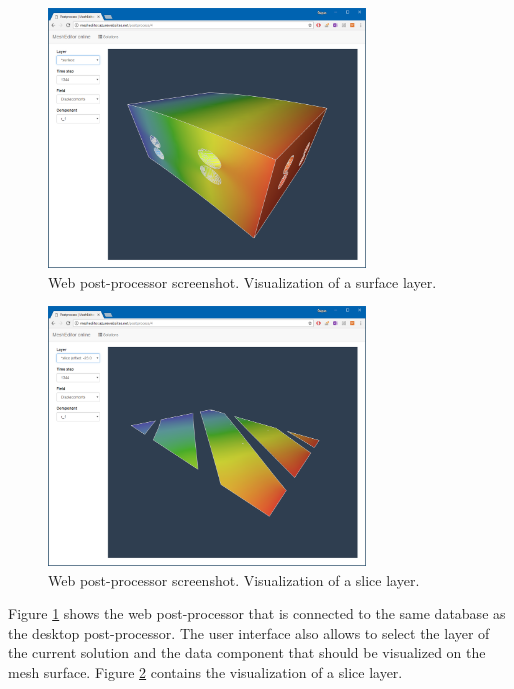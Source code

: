 \begin{figure}[H]
    \centering
    \includegraphics[width=0.75\textwidth]{figures/chapter-data-management/web-postprocessor-surface}
    \decoRule
    \caption{Web post-processor screenshot. Visualization of a surface layer.}
    \label{fig:web-postprocessor-surface}
\end{figure}

\begin{figure}[H]
    \centering
    \includegraphics[width=0.75\textwidth]{figures/chapter-data-management/web-postprocessor-slice}
    \decoRule
    \caption{Web post-processor screenshot. Visualization of a slice layer.}
    \label{fig:web-postprocessor-slice}
\end{figure}

Figure \ref{fig:web-postprocessor-surface} shows the web post-processor that is connected to the same database as the desktop post-processor. The user interface also allows to select the layer of the current solution and the data component that should be visualized on the mesh surface. Figure \ref{fig:web-postprocessor-slice} contains the visualization of a slice layer.

